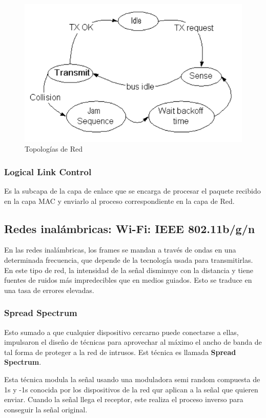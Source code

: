 \begin{figure}[H]
	\centering
	\includegraphics[width=\textwidth
]{images/csma-cd.png}
	\caption[Topologías de Red]{Topologías de Red}
	\label{fig:csma-cd}
\end{figure}

\subsubsection{Logical Link Control}
Es la subcapa de la capa de enlace que se encarga de procesar el paquete recibido en la capa MAC y enviarlo al proceso correspondiente en la capa de Red.

\subsection{Redes inalámbricas: Wi-Fi: IEEE 802.11b/g/n}
En las redes inalámbricas, los frames se mandan a través de ondas en una determinada frecuencia, que depende de la tecnología usada para transmitirlas. En este tipo de red, la intensidad de la señal disminuye con la distancia y tiene fuentes de ruidos más impredecibles que en medios guiados. Esto se traduce en una tasa de errores elevadas.

\subsubsection*{Spread Spectrum}
Esto sumado a que cualquier dispositivo cercarno puede conectarse a ellas, impulsaron el diseño de técnicas para aprovechar al máximo el ancho de banda de tal forma de proteger a la red de intrusos. Est técnica es llamada \textbf{Spread Spectrum}.

Esta técnica modula la señal usando una moduladora semi random compuesta de 1s y -1s conocida por los dispositivos de la red qur aplican a la señal que quieren enviar. Cuando la señal llega el receptor, este realiza el proceso inverso para conseguir la señal original.

